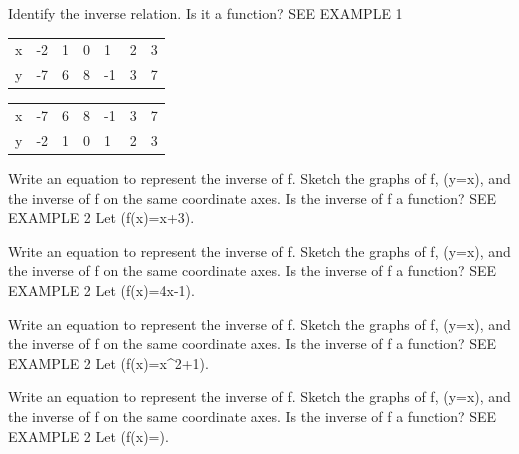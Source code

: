\documentclass{article}
\newenvironment{practice}[2]{}{}        %
\newcommand{\answer}[1]{}               %
\newcommand{\placeholder}[2]{}          %
\newcommand{\te}[1]{}                   %
\begin{document}
\begin{practice}{17}{1}
Identify the inverse relation. Is it a function? SEE EXAMPLE 1
\begin{tabular}{lllllll}
x & -2 & 1 & 0 & 1 & 2 & 3 \\
y & -7 & 6 & 8 & -1 & 3 & 7 \\
\end{tabular}
\answer{The inverse is a function.}
\begin{tabular}{lllllll}
x & -7 & 6 & 8 & -1 & 3 & 7 \\
y & -2 & 1 & 0 & 1 & 2 & 3 \\
\end{tabular}
\te{Answer printed on PDF page 86.}
\end{practice}
\begin{practice}{18}{1}
Write an equation to represent the inverse of f. Sketch the graphs of f, (y=x), and the inverse of f on the same coordinate axes. Is the inverse of f a function? SEE EXAMPLE 2
Let (f(x)=x+3).
\answer{(f^{-1}(x)=x-3); The inverse of f is a function.}
\placeholder{graph}{Printed answer: unit grid x,y from -5 to 5, labels -4,-2,2,4, origin O. Parallel lines blue f(x)=x+3, green y=x, orange f inverse(x)=x-3. Arrows at both ends of all lines.}
\te{Answer printed on PDF page 86.}
\end{practice}
\begin{practice}{19}{1}
Write an equation to represent the inverse of f. Sketch the graphs of f, (y=x), and the inverse of f on the same coordinate axes. Is the inverse of f a function? SEE EXAMPLE 2
Let (f(x)=4x-1).
\answer{(f^{-1}(x)=\frac{x+1}{4}); The inverse of f is a function.}
\placeholder{graph}{Printed answer: unit grid x,y from -5 to 5, labels -4,-2,2,4, origin O. Steep blue f(x)=4x-1 with y-intercept -1, shallow orange f inverse(x)=(x+1)/4 with y-intercept 0.25, green diagonal y=x. Arrows at both ends of all lines.}
\te{Answer printed on PDF page 86.}
\end{practice}
\begin{practice}{20}{1}
Write an equation to represent the inverse of f. Sketch the graphs of f, (y=x), and the inverse of f on the same coordinate axes. Is the inverse of f a function? SEE EXAMPLE 2
Let (f(x)=x^2+1).
\answer{See back of book.}
\end{practice}
\begin{practice}{21}{1}
Write an equation to represent the inverse of f. Sketch the graphs of f, (y=x), and the inverse of f on the same coordinate axes. Is the inverse of f a function? SEE EXAMPLE 2
Let (f(x)=).
\answer{See back of book.}
\end{practice}
\end{document}
